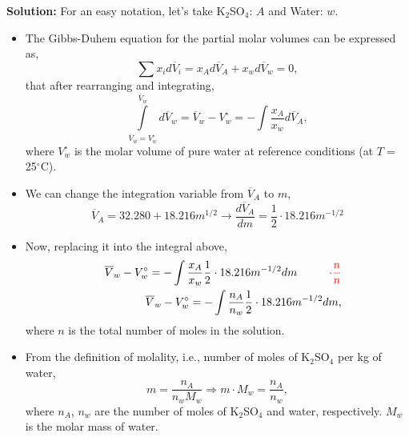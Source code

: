 \documentclass[12pts,a4paper,amsmath,amssymb,floatfix]{article}%
\newcommand{\frc}{\displaystyle\frac}
\newcommand{\red}{\textcolor{red}}
\begin{document}
\begin{enumerate}[label=\bfseries Example \arabic*]
\bigskip

{\bf Solution:} For an easy notation, let's take K$_{2}$SO$_{4}$: $A$ and Water: $w$.
\begin{itemize}
  \item The Gibbs-Duhem equation for the partial molar volumes can be expressed as,
     \begin{displaymath}
        \sum\limits x_{i}d\overline{V}_{i} = x_{A} d\overline{V}_{A} + x_{w} d\overline{V}_{w} = 0,
     \end{displaymath}
     that after rearranging and integrating,
     \begin{displaymath}
        \int\limits_{\overline{V}_{w}=V_{w}^{\circ}}^{\overline{V}_{w}}d\overline{V}_{w} = \overline{V}_{w} - V_{w}^{\circ} = -\int\frc{x_{A}}{x_{w}} d\overline{V}_{A},
     \end{displaymath}
     where $V_{w}^{\circ}$ is the molar volume of pure water at reference conditions (at $T=$ 25$^{\circ}$C).

  \item We can change the integration variable from $\overline{V}_{A}$ to $m$,
      \begin{displaymath}
         \overline{V}_{A} = 32.280 + 18.216 m^{1/2} \rightarrow \frc{d\overline{V}_{A}}{dm} = \frc{1}{2}\cdot 18.216 m^{-1/2} 
      \end{displaymath} 
  
  \item Now, replacing it into the integral above,
       \begin{eqnarray}
          && \overline{V}_{w} - V_{w}^{\circ} = -\int\frc{x_{A}}{x_{w}} \frc{1}{2}\cdot 18.216 m^{-1/2} dm \hspace{1cm} \red{\cdot\frc{n}{n}} \nonumber \\
          && \overline{V}_{w} - V_{w}^{\circ} = -\int\frc{n_{A}}{n_{w}} \frc{1}{2}\cdot 18.216 m^{-1/2} dm, \label{example4:eqn1}
       \end{eqnarray}
       where $n$ is the total number of moles in the solution.

  \item From the definition of molality, i.e., number of moles of K$_{2}$SO$_{4}$ per kg of water,
       \begin{displaymath}
           m = \frc{n_{A}}{n_{w}M_{w}} \Longrightarrow m\cdot M_{w} = \frc{n_{A}}{n_{w}},
       \end{displaymath}
       where $n_{A}$, $n_{w}$ are the number of moles of K$_{2}$SO$_{4}$ and water, respectively. $M_{w}$ is the molar mass of water.


\end{itemize}
\end{enumerate}
\end{document}
